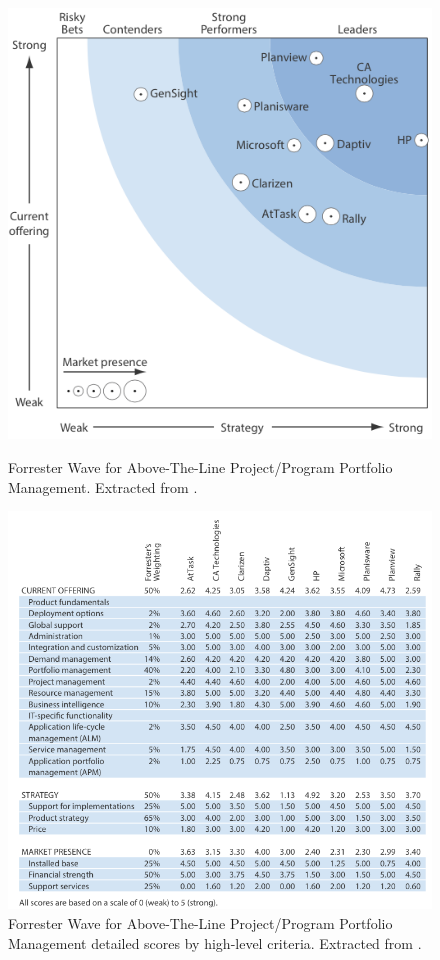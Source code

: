 \begin{figure}[h!]
\begin{minipage}[h!]{0.40\linewidth}
\centering
\includegraphics[width=\textwidth]{img/AboveLineWave.png}
\caption{Forrester Wave for Above-The-Line Project/Program Portfolio Management. Extracted from \cite{forresterWavePPM}.}
\label{fig:figure1}
\end{minipage}
\hspace{0.5cm}
\begin{minipage}[h!]{0.60\linewidth}
\centering
\includegraphics[width=\textwidth]{img/AboveLineScores.png}
\caption{Forrester Wave for Above-The-Line Project/Program Portfolio Management detailed scores by high-level criteria. Extracted from \cite{forresterWavePPM}.}
\label{fig:figure2}
\end{minipage}
\end{figure}

